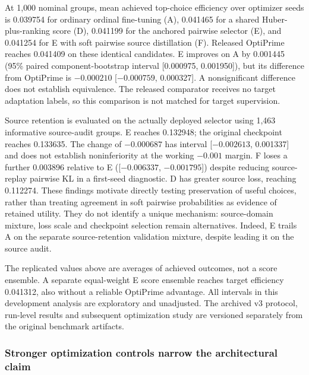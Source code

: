 At 1{,}000 nominal groups, mean achieved top-choice efficiency over optimizer seeds
is 0.039754 for ordinary ordinal fine-tuning (A), 0.041465 for a shared
Huber-plus-ranking score (D), 0.041199 for the anchored pairwise selector (E), and
0.041254 for E with soft pairwise source distillation (F). Released OptiPrime reaches
0.041409 on these identical candidates. E improves on A by 0.001445
(95\% paired component-bootstrap interval [0.000975, 0.001950]), but its difference
from OptiPrime is $-0.000210$ [${-}0.000759$, 0.000327]. A nonsignificant difference
does not establish equivalence. The released comparator receives no target
adaptation labels, so this comparison is not matched for target supervision.

Source retention is evaluated on the actually deployed selector using 1{,}463
informative source-audit groups. E reaches 0.132948; the original checkpoint
reaches 0.133635. The change of $-0.000687$ has interval
[${-}0.002613$, 0.001337] and does not establish noninferiority at the working
$-0.001$ margin. F loses a further 0.003896 relative to E
([${-}0.006337$, ${-}0.001795$]) despite reducing source-replay pairwise KL in a
first-seed diagnostic. D has greater source loss, reaching 0.112274. These
findings motivate directly testing preservation of useful choices, rather than
treating agreement in soft pairwise probabilities as evidence of retained utility.
They do not identify a unique mechanism: source-domain mixture, loss scale and
checkpoint selection remain alternatives. Indeed, E trails A on the separate
source-retention validation mixture, despite leading it on the source audit.

The replicated values above are averages of achieved outcomes, not a score
ensemble. A separate equal-weight E score ensemble reaches target efficiency
0.041312, also without a reliable OptiPrime advantage. All intervals in this
development analysis are exploratory and unadjusted. The archived v3 protocol,
run-level results and subsequent optimization study are versioned separately
from the original benchmark artifacts.

\subsubsection{Stronger optimization controls narrow the architectural claim}

